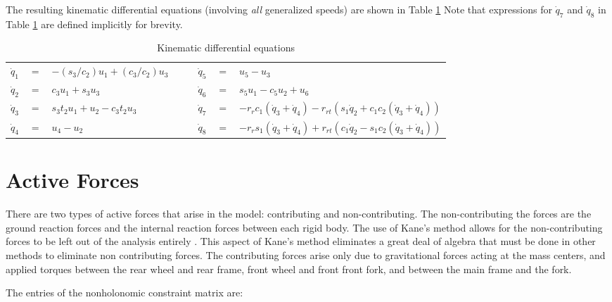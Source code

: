 \documentclass[letterpaper,11pt]{article}
\begin{document}
The resulting kinematic differential equations
(involving {\it{all}} generalized speeds) are shown in Table \ref{kindiffs}
Note that expressions for $\dot{q}_7$ and $\dot{q}_8$ in Table \ref{kindiffs}
are defined implicitly for brevity.
\begin{table}[!h]
  \begin{center}
    \begin{tabular}{rclcrcl}
        $\dot{q}_1$ & $=$ & $-(s_3/c_2) u_1 + (c_3/c_2) u_3$ &$\quad$&
        $\dot{q}_5$ & $=$ & $u_5 - u_3$ \\
        $\dot{q}_2$ & $=$ & $c_3 u_1 + s_3 u_3$ &$\quad$&
        $\dot{q}_6$ & $=$ & $s_5 u_1 - c_5 u_2 + u_6$ \\
        $\dot{q}_3$ & $=$ & $s_3 t_2 u_1 + u_2 - c_3 t_2 u_3$ &$\quad$&
        $\dot{q}_7$ & $=$ & $-r_r c_1 (\dot{q}_3 + \dot{q}_4) -
        r_{rt}(s_1 \dot{q}_2 + c_1 c_2 (\dot{q}_3 + \dot{q}_4))$\\
        $\dot{q}_4$ & $=$ & $u_4 - u_2$ & $\quad$ &
        $\dot{q}_8$ & $=$ & $-r_r s_1 (\dot{q}_3 + \dot{q}_4) +
        r_{rt}(c_1 \dot{q}_2 - s_1 c_2 (\dot{q}_3 + \dot{q}_4))$
    \end{tabular}
  \end{center}
  \caption{Kinematic differential equations}
  \label{kindiffs}
\end{table}

\section{Active Forces}

There are two types of active forces that arise in the model: contributing and
non-contributing.  The non-contributing the forces are the ground reaction
forces and the internal reaction forces between each rigid body.  The use of
Kane's method allows for the non-contributing forces to be left out of the
analysis entirely \cite{Kane1985}.  This aspect of Kane's method eliminates a
great deal of algebra that must be done in other methods to eliminate non
contributing forces.  The contributing forces arise only due to gravitational
forces acting at the mass centers, and applied torques between the rear wheel
and rear frame, front wheel and front front fork, and between the main frame
and the fork.


\appendix

The entries of the nonholonomic constraint matrix are:
\end{document}
